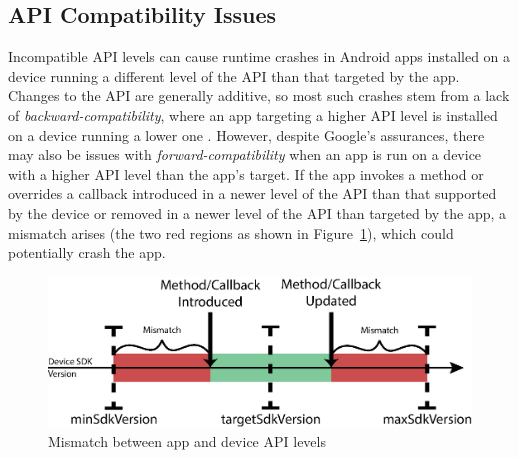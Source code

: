     
\subsection{API Compatibility Issues}
\label{API Compatibility Issues}

Incompatible API levels can cause runtime crashes in
Android apps installed on a device running a different
level of the API than that targeted by the app. Changes
to the API are generally additive, so most such crashes
stem from a lack of {\it backward-compatibility}, where
an app targeting a higher API level is installed on a
device running a lower one \cite{sdkversions}. However,
despite Google's assurances, there may also be issues
with {\it forward-compatibility} when an app is run on
a device with a higher API level than the app's target.
If the app invokes a method or overrides a callback
introduced in a newer level of the API than that
supported by the device or removed in a newer level of
the API than targeted by the app, a mismatch arises
(the two red regions as shown in
Figure~\ref{fig:api-mismatch}), which could potentially
crash the app.

\begin{figure}%
    \centering
    \includegraphics[width=0.85\columnwidth]{images/api-mismatch} 
    \caption{Mismatch between app and device API levels} 
    \label{fig:api-mismatch} 
\end{figure}

